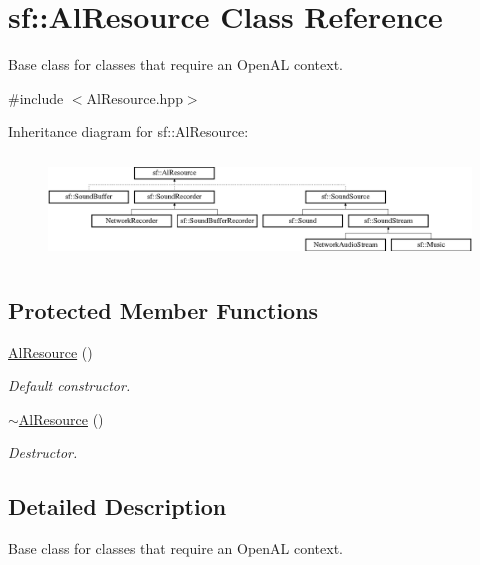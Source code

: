 \hypertarget{classsf_1_1_al_resource}{}\section{sf\+:\+:Al\+Resource Class Reference}
\label{classsf_1_1_al_resource}


Base class for classes that require an Open\+AL context.  




{\ttfamily \#include $<$Al\+Resource.\+hpp$>$}

Inheritance diagram for sf\+:\+:Al\+Resource\+:\begin{figure}[H]
\begin{center}
\leavevmode
\includegraphics[height=2.800000cm]{classsf_1_1_al_resource}
\end{center}
\end{figure}
\subsection*{Protected Member Functions}
\begin{DoxyCompactItemize}
\item 
\mbox{\label{classsf_1_1_al_resource_a51b4f3a825c5d68386f8683e3e1053d7}} 
\hyperlink{classsf_1_1_al_resource_a51b4f3a825c5d68386f8683e3e1053d7}{Al\+Resource} ()
\begin{DoxyCompactList}\small\item\em Default constructor. \end{DoxyCompactList}\item 
\mbox{\label{classsf_1_1_al_resource_a74ad78198cddcb6e5d847177364049db}} 
\hyperlink{classsf_1_1_al_resource_a74ad78198cddcb6e5d847177364049db}{$\sim$\+Al\+Resource} ()
\begin{DoxyCompactList}\small\item\em Destructor. \end{DoxyCompactList}\end{DoxyCompactItemize}


\subsection{Detailed Description}
Base class for classes that require an Open\+AL context. 

